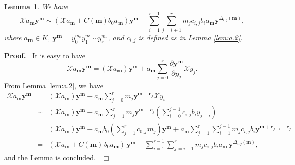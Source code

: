 \documentclass[preprint,12pt]{elsarticle}
\newtheorem{lem}[thm]{Lemma}
\newenvironment{proof}[1][Proof]{\textbf{#1.}\ }{\ $\Box$}
\begin{document}
\begin{lem}
\label{lem:a.6} We have
\begin{equation}
\mathscr{X}a_{\mathbf{m}}\mathbf{y}^\mathbf{m}\sim (\mathscr{X}a_{\mathbf{m}}  + C({\mathbf{m}}) b_0
a_{\mathbf{m}})\mathbf{y}^{\mathbf{m}} + \sum_{i =
1}^{r-1}\sum_{j=i+1}^rm_jc_{i,j}b_ia_\mathbf{m}\mathbf{y}^{\Delta_{i,j}(\mathbf{m})},
\end{equation}
where $a_\mathbf{m}\in K$,  $\mathbf{y}^{\mathbf{m}} = y_0^{m_0}y_1^{m_1}\cdots y_r^{m_r}$, and $c_{i,j}$ is defined as in Lemma \ref{lem:a.2}.
\end{lem}
\begin{proof} It is easy to have
$$\mathscr{X}a_{\mathbf{m}}\mathbf{y}^{\mathbf{m}} = (\mathscr{X}a_{\mathbf{m}}) \mathbf{y}^{\mathbf{m}}+ a_{\mathbf{m}}\sum_{j=0}^r \dfrac{\partial \mathbf{y}^{\mathbf{m}}}{\partial y_j}\mathscr{X}y_j.$$
From Lemma \ref{lem:a.2}, we have
\begin{eqnarray*}
\mathscr{X}a_{\mathbf{m}}\mathbf{y}^{\mathbf{m}} &=&(\mathscr{X}a_\mathbf{m})\mathbf{y}^{\mathbf{m}} + a_\mathbf{m} \sum_{j=0}^r m_j \mathbf{y}^{\mathbf{m}-\mathbf{e}_j} \mathscr{X}y_i\\
&\sim&(\mathscr{X}a_\mathbf{m})\mathbf{y}^{\mathbf{m}} + a_\mathbf{m}\,\sum_{j=1}^r m_j \mathbf{y}^{\mathbf{m}-\mathbf{e}_j}(\sum_{i=0}^{j-1}c_{i,j} b_i y_{j-i})\\
&=&(\mathscr{X}a_\mathbf{m})\mathbf{y}^{\mathbf{m}} +
a_\mathbf{m} b_0(\sum_{j = 1}^rc_{0, j} m_j)\mathbf{y}^{\mathbf{m}} + a_\mathbf{m}\sum_{j=1}^r\sum_{i = 1}^{j-1}m_jc_{i,j}b_i \mathbf{y}^{\mathbf{m} + \mathbf{e}_{j-i} -\mathbf{e}_j}\\
&=&(\mathscr{X} a_{\mathbf{m}} + C({\mathbf{m}})\, b_0 a_{\mathbf{m}})\,\mathbf{y}^{\mathbf{m}} + \sum_{i =
1}^{r-1}\sum_{j=i+1}^r m_j c_{i,j} b_i a_\mathbf{m}\,\mathbf{y}^{\Delta_{i,j}(\mathbf{m})},
\end{eqnarray*}
and the Lemma is concluded.
\end{proof}
\end{document}
